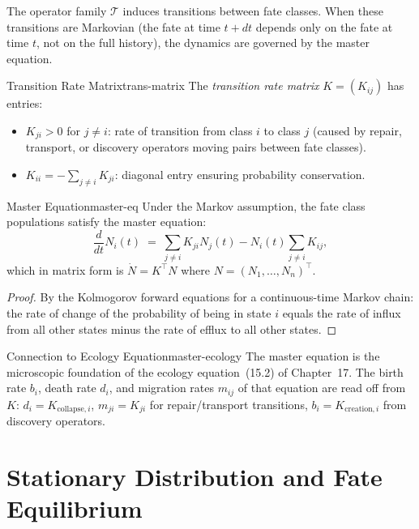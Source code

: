 \documentclass[12pt,twoside,openright]{book}
\newcommand{\transfam}{\mathcal{T}}       %
\providecommand{\transRate}{K}
\begin{document}
The operator family $\transfam$ induces transitions between
fate classes. When these transitions are Markovian (the fate
at time $t+dt$ depends only on the fate at time $t$, not on
the full history), the dynamics are governed by the master
equation.

\begin{definition}{Transition Rate Matrix}{trans-matrix}
The \emph{transition rate matrix} $\transRate=(K_{ij})$ has
entries:
\begin{itemize}[nosep,leftmargin=2em]
  \item $K_{ji}>0$ for $j\neq i$: rate of transition from
    class $i$ to class $j$ (caused by repair, transport,
    or discovery operators moving pairs between fate classes).
  \item $K_{ii}=-\sum_{j\neq i}K_{ji}$: diagonal entry
    ensuring probability conservation.
\end{itemize}
\end{definition}

\begin{theorem}{Master Equation}{master-eq}
Under the Markov assumption, the fate class populations
satisfy the master equation:
\[
  \frac{d}{dt}N_i(t)
  \;=\;
  \sum_{j\neq i}K_{ji}N_j(t)
  - N_i(t)\sum_{j\neq i}K_{ij},
\]
which in matrix form is $\dot{N}=\transRate^{\top}N$ where
$N=(N_1,\ldots,N_n)^{\top}$.
\begin{proof}
By the Kolmogorov forward equations for a continuous-time
Markov chain: the rate of change of the probability of
being in state $i$ equals the rate of influx from all
other states minus the rate of efflux to all other states.
\end{proof}
\end{theorem}

\begin{remark}{Connection to Ecology Equation}{master-ecology}
The master equation is the microscopic foundation of the
ecology equation~(15.2) of Chapter~17. The birth rate $b_i$,
death rate $d_i$, and migration rates $m_{ij}$ of that
equation are read off from $\transRate$: $d_i=K_{\mathrm{collapse},i}$,
$m_{ji}=K_{ji}$ for repair/transport transitions,
$b_i=K_{\mathrm{creation},i}$ from discovery operators.
\end{remark}

\section{Stationary Distribution and Fate Equilibrium}
\end{document}
